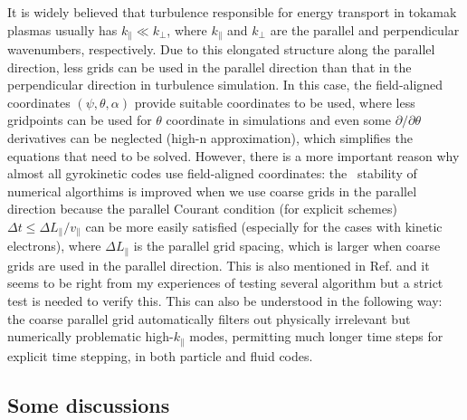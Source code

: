 \documentclass{llncs}
\begin{document}
It is widely believed that turbulence responsible for energy transport in
tokamak plasmas usually has $k_{\parallel} \ll k_{\perp}$, where
$k_{\parallel}$ and $k_{\perp}$ are the parallel and perpendicular
wavenumbers, respectively. Due to this elongated structure along the parallel
direction, less grids can be used in the parallel direction than that in the
perpendicular direction in turbulence simulation. In this case, the
field-aligned coordinates $(\psi, \theta, \alpha)$ provide suitable
coordinates to be used, where less gridpoints can be used for $\theta$
coordinate in simulations and even some $\partial / \partial \theta$
derivatives can be neglected (high-n approximation), which simplifies the
equations that need to be solved. However, there is a more important reason
why almost all gyrokinetic codes use field-aligned coordinates: the \
stability of numerical algorthims is improved when we use coarse grids in the
parallel direction because the parallel Courant condition (for explicit
schemes) $\Delta t \leqslant \Delta L_{\parallel} / v_{\parallel}$ can be more
easily satisfied (especially for the cases with kinetic electrons), where
$\Delta L_{\parallel}$ is the parallel grid spacing, which is larger when
coarse grids are used in the parallel direction. This is also mentioned in
Ref. {\cite{ottaviani2011}} and it seems to be right from my experiences of
testing several algorithm but a strict test is needed to verify this. This can
also be understood in the following way: the coarse parallel grid
automatically filters out physically irrelevant but numerically problematic
high-$k_{\parallel}$ modes, permitting much longer time steps for explicit
time stepping, in both particle and fluid codes{\cite{dimits1993}}.

\subsection{Some discussions}
\end{document}
